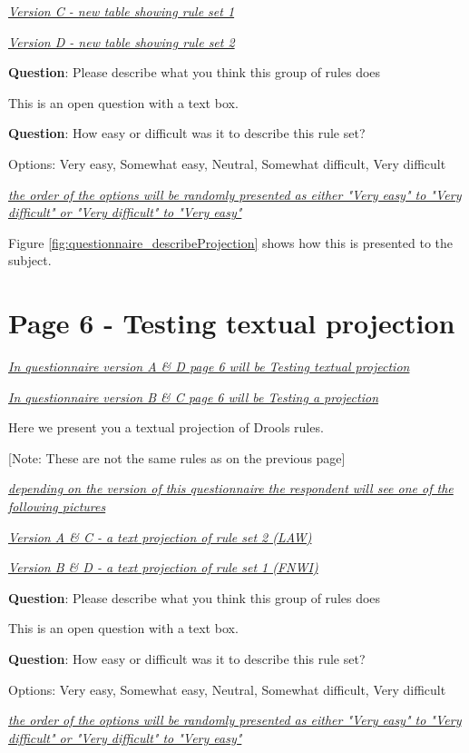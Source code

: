 \emph{\underline{Version C - new table showing rule set 1}}

\emph{\underline{Version D - new table showing rule set 2}}

\textbf{Question}: Please describe what you think this group of rules does

This is an open question with a text box.

\textbf{Question}: How easy or difficult was it to describe this rule set?

Options: Very easy, Somewhat easy, Neutral, Somewhat difficult, Very difficult 

\emph{\underline{the order of the options will be randomly presented as either "Very easy" to "Very difficult" or "Very difficult" to "Very easy"}}

Figure \ref{fig:questionnaire_describeProjection} shows how this is presented to the subject.

\section{Page 6 - Testing textual projection}
\emph{\underline{In questionnaire version A \& D page 6 will be Testing textual projection}}

\emph{\underline{In questionnaire version B \& C page 6 will be Testing a projection}}

Here we present you a textual projection of Drools rules.

[Note: These are not the same rules as on the previous page]

\emph{\underline{depending on the version of this questionnaire the respondent will see one of the following pictures}}

\emph{\underline{Version A \& C - a text projection of rule set 2 (LAW)}}

\emph{\underline{Version B \& D - a text projection of rule set 1 (FNWI)}}

\textbf{Question}: Please describe what you think this group of rules does

This is an open question with a text box.

\textbf{Question}: How easy or difficult was it to describe this rule set?

Options: Very easy, Somewhat easy, Neutral, Somewhat difficult, Very difficult 

\emph{\underline{the order of the options will be randomly presented as either "Very easy" to "Very difficult" or "Very difficult" to "Very easy"}}

